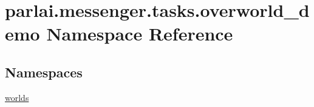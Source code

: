 \hypertarget{namespaceparlai_1_1messenger_1_1tasks_1_1overworld__demo}{}\section{parlai.\+messenger.\+tasks.\+overworld\+\_\+demo Namespace Reference}
\label{namespaceparlai_1_1messenger_1_1tasks_1_1overworld__demo}
\subsection*{Namespaces}
\begin{DoxyCompactItemize}
\item 
 \hyperlink{namespaceparlai_1_1messenger_1_1tasks_1_1overworld__demo_1_1worlds}{worlds}
\end{DoxyCompactItemize}
